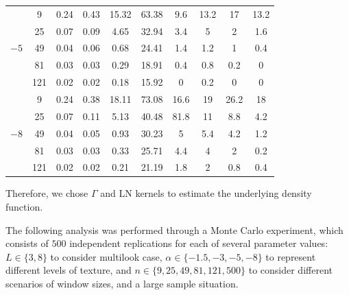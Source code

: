 \documentclass[twocolumn]{svjour3}
\begin{document}
\begin{table}[hbt]
\begin{tabular}{c c S[table-format=2.2]S[table-format=2.2]S[table-format=2.2] S[table-format=2.2] @{\hskip 4mm} S[table-format=2.1]S[table-format=2.1]S[table-format=2.1]S[table-format=2.1]}
			\cmidrule(r){3-6}
			\cmidrule(r){7-10}                                       
			&  9       &       0.24     &     0.43     &     15.32     &     63.38     &    9.6    &    13.2    &   17         &    13.2 \\                    
			&  25      &       0.07     &     0.09     &     4.65      &     32.94     &    3.4    &   5        &    2         &    1.6 \\                    
			&  49      &       0.04     &     0.06     &     0.68      &     24.41     &    1.4    &    1.2     &    1         &    0.4 \\
			&  81      &       0.03     &     0.03     &     0.29      &     18.91     &    0.4    &    0.8     &    0.2       &    0 \\
			&  121     &       0.02     &     0.02     &     0.18      &     15.92     &    0      &    0.2     &    0         &    0 \\
			
			\cmidrule(r){3-6}
			\cmidrule(r){7-10}                                        
			&  9       &       0.24     &     0.38     &     18.11     &     73.08     &    16.6    &    19     & 26.2         &    18 \\                
			&  25      &       0.07     &     0.11     &     5.13      &     40.48     &    81.8    &   11      &    8.8       &    4.2 \\            
			&  49      &       0.04     &     0.05     &     0.93      &     30.23     &    5       &    5.4    &    4.2       &    1.2 \\    
			&  81      &       0.03     &     0.03     &     0.33      &     25.71     &    4.4     &    4      &    2         &    0.2 \\    
			&  121     &       0.02     &     0.02     &     0.21      &     21.19     &    1.8     &    2      &    0.8       &    0.4 \\
			\bottomrule
		\end{tabular}                                              
	\end{table}    
	
	Therefore, we chose $\Gamma$ and LN kernels to estimate the underlying density function.
	
	The following analysis was performed through a Monte Carlo experiment, which consists of $500$ independent replications for each of several parameter values: 
	$L\in\{3,8\}$ to consider multilook case,
	$\alpha\in\{-1.5, -3, -5, -8\}$ to represent different levels of texture, 
	and 
	$n\in\{9, 25,49, 81,121,500\}$ to consider different scenarios of window sizes, and a large sample situation.
	
\end{document}
